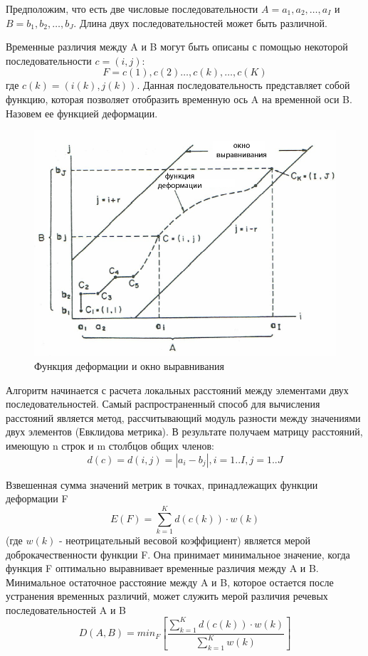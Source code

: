 \documentclass[14pt,russian,utf8,nocolumnsxix]{extarticle}
\begin{document}
Предположим, что есть две числовые последовательности $A= a_{1}, a_{2}, \dots, a_{I}$ и $B=b_{1}, b_{2}, \dots, b_{J}$. Длина двух последовательностей может быть различной.

Временные различия между A и B могут быть описаны с помощью некоторой последовательности $c=(i,j)$:
\[
	F=c(1),c(2)\dots,c(k),\dots,c(K)
\]
где $c(k)=(i(k),j(k))$.
Данная последовательность представляет собой функцию, которая позволяет отобразить временную ось A на временной оси B. Назовем ее функцией деформации. \cite{sakoechiba}

\begin{figure}[H]	
	\centering
	\includegraphics[width=120mm]{sakoe1.png}			
	\caption{Функция деформации и окно выравнивания}
	\label{sakoe1}
\end{figure}

Алгоритм начинается с расчета локальных расстояний между элементами двух последовательностей. Самый распространенный способ для вычисления расстояний является метод, рассчитывающий модуль разности между значениями двух элементов (Евклидова метрика). В результате получаем матрицу расстояний, имеющую n строк и m столбцов общих членов:
\[
d(c)=d(i,j)=|a_{i}-b_{j}|, i=1..I, j=1..J
\]

Взвешенная сумма значений метрик в точках, принадлежащих функции деформации F
\[
E(F)=\sum_{k=1}^{K}{d(c(k))\cdot w(k)}
\]
(где $w(k)$ - неотрицательный весовой коэффициент) является мерой доброкачественности функции F. Она принимает минимальное значение, когда функция F оптимально выравнивает временные различия между A и B. Минимальное остаточное расстояние между A и B, которое остается после устранения временных различий, может служить мерой различия речевых последовательностей A и B
\[
D(A,B)=min_F\left[\frac{\sum_{k=1}^{K}{d(c(k))\cdot w(k)}}{\sum_{k=1}^{K}{w(k)}}\right]
\]
\end{document}
